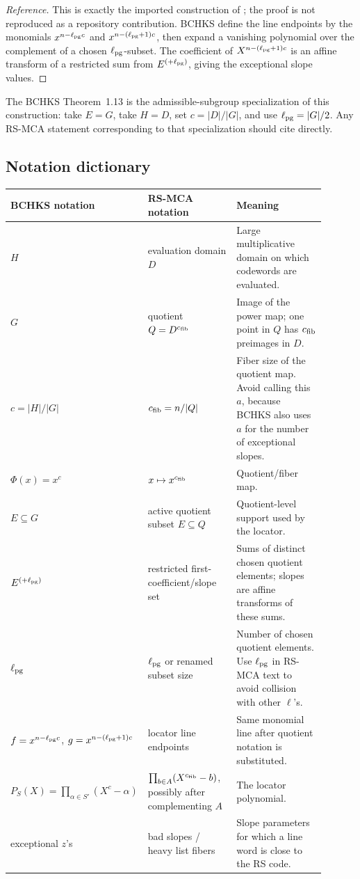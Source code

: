 \documentclass[11pt]{article}
\newcommand{\efib}{c_{\rm fib}}
\newcommand{\ellpg}{\ell_{\rm pg}}
\begin{document}
\begin{proof}[Reference]
This is exactly the imported construction of \cite[Thm.~7.1]{BCHKS25}; the
proof is not reproduced as a repository contribution.  BCHKS define the line
endpoints by the monomials \(x^{n-\ellpg c}\) and
\(x^{n-(\ellpg+1)c}\), then expand a vanishing polynomial over the complement
of a chosen \(\ellpg\)-subset.  The coefficient of
\(X^{n-(\ellpg+1)c}\) is an affine transform of a restricted sum from
\(E^{(+\ellpg)}\), giving the exceptional slope values.
\end{proof}

The BCHKS Theorem~1.13 is the admissible-subgroup specialization of this
construction: take \(E=G\), take \(H=D\), set \(c=|D|/|G|\), and use
\(\ellpg=|G|/2\).  Any RS-MCA statement corresponding to that specialization
should cite \cite[Thm.~1.13]{BCHKS25} directly.

\subsection{Notation dictionary}

\begin{center}
\begin{tabular}{p{0.28\linewidth}p{0.30\linewidth}p{0.32\linewidth}}
\textbf{BCHKS notation} & \textbf{RS-MCA notation} & \textbf{Meaning}\\
\hline
\(H\) & evaluation domain \(D\) & Large multiplicative domain on which codewords are evaluated.\\
\(G\) & quotient \(Q=D^{\efib}\) & Image of the power map; one point in \(Q\) has \(\efib\) preimages in \(D\).\\
\(c=|H|/|G|\) & \(\efib=n/|Q|\) & Fiber size of the quotient map.  Avoid calling this \(a\), because BCHKS also uses \(a\) for the number of exceptional slopes.\\
\(\Phi(x)=x^c\) & \(x\mapsto x^{\efib}\) & Quotient/fiber map.\\
\(E\subseteq G\) & active quotient subset \(E\subseteq Q\) & Quotient-level support used by the locator.\\
\(E^{(+\ellpg)}\) & restricted first-coefficient/slope set & Sums of distinct chosen quotient elements; slopes are affine transforms of these sums.\\
\(\ellpg\) & \(\ellpg\) or renamed subset size & Number of chosen quotient elements.  Use \(\ellpg\) in RS-MCA text to avoid collision with other \(\ell\)'s.\\
\(f=x^{n-\ellpg c}\), \(g=x^{n-(\ellpg+1)c}\) & locator line endpoints & Same monomial line after quotient notation is substituted.\\
\(P_S(X)=\prod_{\alpha\in S'}(X^c-\alpha)\) & \(\prod_{b\in A}(X^{\efib}-b)\), possibly after complementing \(A\) & The locator polynomial.\\
exceptional \(z\)'s & bad slopes / heavy list fibers & Slope parameters for which a line word is close to the RS code.\\
\end{tabular}
\end{center}
\end{document}
